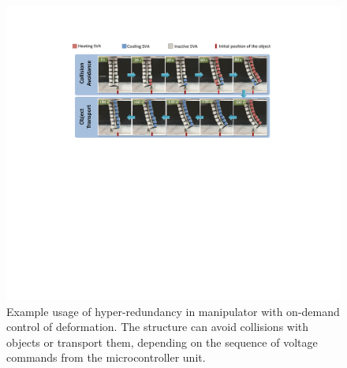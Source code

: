 \begin{figure}[!ht]
\centering
\includegraphics[width=\textwidth]{unstructured.pdf}
\caption[]{Example usage of hyper-redundancy in manipulator with on-demand control of deformation. The structure can avoid collisions with objects or transport them, depending on the sequence of voltage commands from the microcontroller unit.}
\label{fig:unstructured}
\end{figure}

